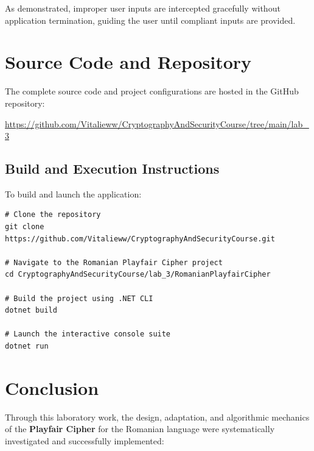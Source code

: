 \documentclass[12pt,a4paper]{article}
\begin{document}
As demonstrated, improper user inputs are intercepted gracefully without application termination, guiding the user until compliant inputs are provided.

\section{Source Code and Repository}

The complete source code and project configurations are hosted in the GitHub repository:
\begin{center}
    \large
    \url{https://github.com/Vitalieww/CryptographyAndSecurityCourse/tree/main/lab_3}
\end{center}

\subsection{Build and Execution Instructions}
To build and launch the application:
\begin{lstlisting}[numbers=none,basicstyle=\small\ttfamily]
# Clone the repository
git clone https://github.com/Vitalieww/CryptographyAndSecurityCourse.git

# Navigate to the Romanian Playfair Cipher project
cd CryptographyAndSecurityCourse/lab_3/RomanianPlayfairCipher

# Build the project using .NET CLI
dotnet build

# Launch the interactive console suite
dotnet run
\end{lstlisting}

\section{Conclusion}

Through this laboratory work, the design, adaptation, and algorithmic mechanics of the \textbf{Playfair Cipher} for the Romanian language were systematically investigated and successfully implemented:
\end{document}
